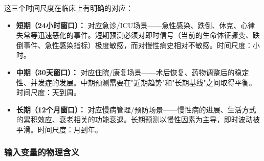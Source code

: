 \documentclass[11pt,a4paper]{ctexart}
\theoremstyle{remark}
\begin{document}
这三个时间尺度在临床上有明确的对应：
\begin{itemize}[nosep]
\item \textbf{短期（24小时窗口）：} 对应急诊/ICU场景——急性感染、跌倒、休克、心律失常等迅速恶化的事件。短期预测必须对即时信号（当前的生命体征骤变、跌倒事件、急性感染指标）极度敏感，而对慢性病史相对不敏感。时间尺度：小时。
\item \textbf{中期（30天窗口）：} 对应住院/康复场景——术后恢复、药物调整后的稳定性、并发症的发展。中期预测需要在"近期趋势"和"长期基线"之间取得平衡。时间尺度：天到周。
\item \textbf{长期（12个月窗口）：} 对应慢病管理/预防场景——慢性病的进展、生活方式的累积效应、衰老相关的功能衰退。长期预测以慢性因素为主导，即时波动被平滑。时间尺度：月到年。
\end{itemize}

\subsubsection{输入变量的物理含义}
\end{document}
